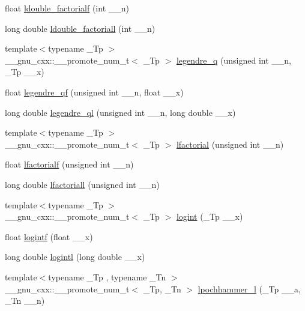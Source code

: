 \begin{DoxyCompactItemize}
\item 
float \hyperlink{namespace____gnu__cxx_a33ecc59a7ff139b483cebf42ecd4fe79}{ldouble\+\_\+factorialf} (int \+\_\+\+\_\+n)
\item 
long double \hyperlink{namespace____gnu__cxx_ae8fa4b4866cfd20349c985b33ed2936e}{ldouble\+\_\+factoriall} (int \+\_\+\+\_\+n)
\item 
{\footnotesize template$<$typename \+\_\+\+Tp $>$ }\\\+\_\+\+\_\+gnu\+\_\+cxx\+::\+\_\+\+\_\+promote\+\_\+num\+\_\+t$<$ \+\_\+\+Tp $>$ \hyperlink{namespace____gnu__cxx_ac0bb3b5a3229e7b7f80982785ff8f477}{legendre\+\_\+q} (unsigned int \+\_\+\+\_\+n, \+\_\+\+Tp \+\_\+\+\_\+x)
\item 
float \hyperlink{namespace____gnu__cxx_aedb2871cec8f0f160524205e9083621d}{legendre\+\_\+qf} (unsigned int \+\_\+\+\_\+n, float \+\_\+\+\_\+x)
\item 
long double \hyperlink{namespace____gnu__cxx_a35de372a666b6d530d4b3704ff4a878b}{legendre\+\_\+ql} (unsigned int \+\_\+\+\_\+n, long double \+\_\+\+\_\+x)
\item 
{\footnotesize template$<$typename \+\_\+\+Tp $>$ }\\\+\_\+\+\_\+gnu\+\_\+cxx\+::\+\_\+\+\_\+promote\+\_\+num\+\_\+t$<$ \+\_\+\+Tp $>$ \hyperlink{namespace____gnu__cxx_a17b1dc664e1ab95213c340f2453b09e3}{lfactorial} (unsigned int \+\_\+\+\_\+n)
\item 
float \hyperlink{namespace____gnu__cxx_a65af05c4093d4895a564a8d67e389a9b}{lfactorialf} (unsigned int \+\_\+\+\_\+n)
\item 
long double \hyperlink{namespace____gnu__cxx_a3a0c196f34916dc68c29c89f26cbe1ee}{lfactoriall} (unsigned int \+\_\+\+\_\+n)
\item 
{\footnotesize template$<$typename \+\_\+\+Tp $>$ }\\\+\_\+\+\_\+gnu\+\_\+cxx\+::\+\_\+\+\_\+promote\+\_\+num\+\_\+t$<$ \+\_\+\+Tp $>$ \hyperlink{namespace____gnu__cxx_a5c80d417c0fbd41cc9ef0d6f663f9a66}{logint} (\+\_\+\+Tp \+\_\+\+\_\+x)
\item 
float \hyperlink{namespace____gnu__cxx_ab878da3ba2f5c1d49d96eadde533b233}{logintf} (float \+\_\+\+\_\+x)
\item 
long double \hyperlink{namespace____gnu__cxx_ab17f5cadc8f77ba2666d0d5ecc78de5d}{logintl} (long double \+\_\+\+\_\+x)
\item 
{\footnotesize template$<$typename \+\_\+\+Tp , typename \+\_\+\+Tn $>$ }\\\+\_\+\+\_\+gnu\+\_\+cxx\+::\+\_\+\+\_\+promote\+\_\+num\+\_\+t$<$ \+\_\+\+Tp, \+\_\+\+Tn $>$ \hyperlink{namespace____gnu__cxx_a5a60fbbf559aa86dfe918d9ef23e8a74}{lpochhammer\+\_\+l} (\+\_\+\+Tp \+\_\+\+\_\+a, \+\_\+\+Tn \+\_\+\+\_\+n)

\end{DoxyCompactItemize}
